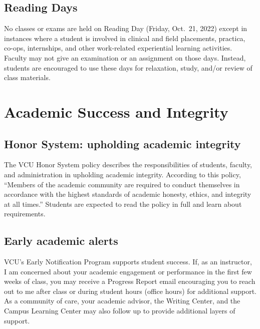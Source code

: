\documentclass[
  letterpaper,
]{book}
\begin{document}
\subsection*{Reading Days}\label{reading-days}

No classes or exams are held on Reading Day (Friday, Oct.~21, 2022)
except in instances where a student is involved in clinical and field
placements, practica, co-ops, internships, and other work-related
experiential learning activities. Faculty may not give an examination or
an assignment on those days. Instead, students are encouraged to use
these days for relaxation, study, and/or review of class materials.

\section*{Academic Success and
Integrity}\label{academic-success-and-integrity}


\subsection*{Honor System: upholding academic
integrity}\label{honor-system-upholding-academic-integrity}

The VCU Honor System policy describes the responsibilities of students,
faculty, and administration in upholding academic integrity. According
to this policy, ``Members of the academic community are required to
conduct themselves in accordance with the highest standards of academic
honesty, ethics, and integrity at all times.'' Students are expected to
read the policy in full and learn about requirements.

\subsection*{Early academic alerts}\label{early-academic-alerts}

VCU's Early Notification Program supports student success. If, as an
instructor, I am concerned about your academic engagement or performance
in the first few weeks of class, you may receive a Progress Report email
encouraging you to reach out to me after class or during student hours
(office hours) for additional support. As a community of care, your
academic advisor, the Writing Center, and the Campus Learning Center may
also follow up to provide additional layers of support.
\end{document}
